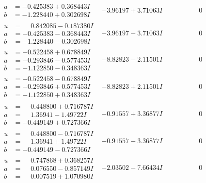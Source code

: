 \documentclass[1p]{elsarticle_modified}
\theoremstyle{definition}
\begin{document}
$$\begin{array}{c|c|c}
\begin{aligned}
a &= -0.425383 + 0.368443 I \\
b &= -1.228440 + 0.302698 I\end{aligned}
 & -3.96197 + 3.71063 I & \phantom{-0.000000 } 0 \\ \hline\begin{aligned}
u &= \phantom{-}0.842085 - 0.187380 I \\
a &= -0.425383 - 0.368443 I \\
b &= -1.228440 - 0.302698 I\end{aligned}
 & -3.96197 - 3.71063 I & \phantom{-0.000000 } 0 \\ \hline\begin{aligned}
u &= -0.522458 + 0.678849 I \\
a &= -0.293846 - 0.577453 I \\
b &= -1.122850 - 0.348363 I\end{aligned}
 & -8.82823 - 2.11501 I & \phantom{-0.000000 } 0 \\ \hline\begin{aligned}
u &= -0.522458 - 0.678849 I \\
a &= -0.293846 + 0.577453 I \\
b &= -1.122850 + 0.348363 I\end{aligned}
 & -8.82823 + 2.11501 I & \phantom{-0.000000 } 0 \\ \hline\begin{aligned}
u &= \phantom{-}0.448800 + 0.716787 I \\
a &= \phantom{-}1.36941 - 1.49722 I \\
b &= -0.449149 + 0.727366 I\end{aligned}
 & -0.91557 + 3.36877 I & \phantom{-0.000000 } 0 \\ \hline\begin{aligned}
u &= \phantom{-}0.448800 - 0.716787 I \\
a &= \phantom{-}1.36941 + 1.49722 I \\
b &= -0.449149 - 0.727366 I\end{aligned}
 & -0.91557 - 3.36877 I & \phantom{-0.000000 } 0 \\ \hline\begin{aligned}
u &= \phantom{-}0.747868 + 0.368257 I \\
a &= \phantom{-}0.076550 - 0.857149 I \\
b &= \phantom{-}0.007519 + 1.070980 I\end{aligned}
 & -2.03502 - 7.66434 I & \phantom{-0.000000 } 0 \\ \hline\begin{aligned}

\end{aligned}
\end{array}$$
\end{document}
